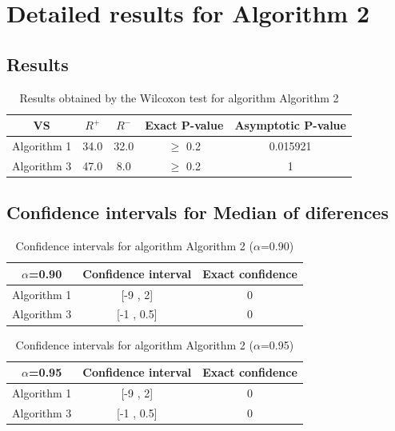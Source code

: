 \documentclass[a4paper,10pt]{article}
\begin{document}
 \clearpage 


\section{Detailed results for Algorithm 2}


\subsection{Results}

\begin{table}[!htp]
\centering\small
\begin{tabular}{
|c|c|c|c|c|}
\hline
 VS & $R^{+}$ & $R^{-}$ & Exact P-value & Asymptotic P-value \\ \hline 
Algorithm 1 & 34.0 & 32.0 & $\geq$ 0.2 & 0.015921\\ \hline 
Algorithm 3 & 47.0 & 8.0 & $\geq$ 0.2 & 1\\ \hline 

\end{tabular}
\caption{Results obtained by the Wilcoxon test for algorithm Algorithm 2}
\end{table}

\subsection{Confidence intervals for Median of diferences}

\begin{table}[!htp]
\centering\small
\begin{tabular}{
|c|c|c|}
\hline
 $\alpha$=0.90 & Confidence interval & Exact confidence \\ \hline 
Algorithm 1 & [-9 , 2] & 0\\ \hline 
Algorithm 3 & [-1 , 0.5] & 0\\ \hline 

\end{tabular}
\caption{Confidence intervals for algorithm Algorithm 2 ($\alpha$=0.90)}
\end{table}
\begin{table}[!htp]
\centering\small
\begin{tabular}{
|c|c|c|}
\hline
 $\alpha$=0.95 & Confidence interval & Exact confidence \\ \hline 
Algorithm 1 & [-9 , 2] & 0\\ \hline 
Algorithm 3 & [-1 , 0.5] & 0\\ \hline 

\end{tabular}
\caption{Confidence intervals for algorithm Algorithm 2 ($\alpha$=0.95)}
\end{table}
\end{document}
